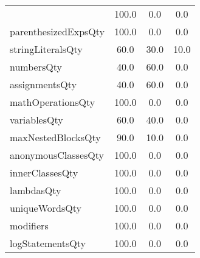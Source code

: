 \begin{tabular}{lccc}
{tryCatchQty & 100.0 & 0.0 & 0.0 \\
parenthesizedExpsQty & 100.0 & 0.0 & 0.0 \\
stringLiteralsQty & 60.0 & 30.0 & 10.0 \\
numbersQty & 40.0 & 60.0 & 0.0 \\
assignmentsQty & 40.0 & 60.0 & 0.0 \\
mathOperationsQty & 100.0 & 0.0 & 0.0 \\
variablesQty & 60.0 & 40.0 & 0.0 \\
maxNestedBlocksQty & 90.0 & 10.0 & 0.0 \\
anonymousClassesQty & 100.0 & 0.0 & 0.0 \\
innerClassesQty & 100.0 & 0.0 & 0.0 \\
lambdasQty & 100.0 & 0.0 & 0.0 \\
uniqueWordsQty & 100.0 & 0.0 & 0.0 \\
modifiers & 100.0 & 0.0 & 0.0 \\
logStatementsQty & 100.0 & 0.0 & 0.0 \\
\bottomrule
              \end{tabular}
            